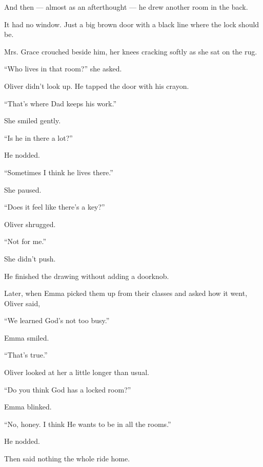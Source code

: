 And then --- almost as an afterthought --- he drew another room in the back.

It had no window. Just a big brown door with a black line where the lock should be.

Mrs. Grace crouched beside him, her knees cracking softly as she sat on the rug.

``Who lives in that room?'' she asked.

Oliver didn’t look up. He tapped the door with his crayon.

``That’s where Dad keeps his work.''

She smiled gently.

``Is he in there a lot?''

He nodded.

``Sometimes I think he lives there.''

She paused.

``Does it feel like there’s a key?''

Oliver shrugged.

``Not for me.''

She didn’t push.

He finished the drawing without adding a doorknob.

Later, when Emma picked them up from their classes and asked how it went, Oliver said,

``We learned God’s not too busy.''

Emma smiled.

``That’s true.''

Oliver looked at her a little longer than usual.

``Do you think God has a locked room?''

Emma blinked.

``No, honey. I think He wants to be in all the rooms.''

He nodded.

Then said nothing the whole ride home.

\medskip

